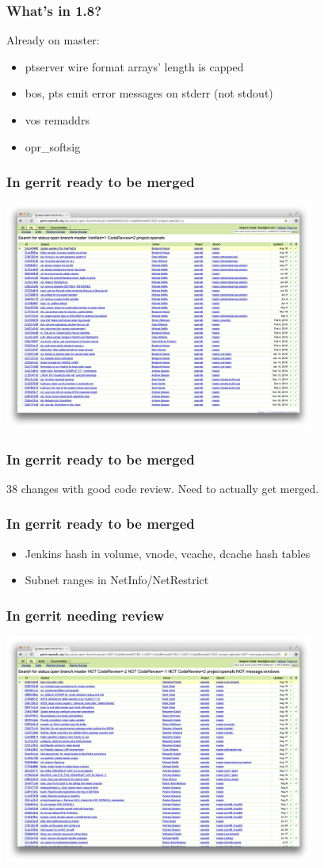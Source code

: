 \documentclass{beamer}
\begin{document}
\begin{frame}
\frametitle{What's in 1.8?}
Already on master:
\begin{itemize}
\item{ptserver wire format arrays' length is capped}
\item{bos, pts emit error messages on stderr (not stdout)}
\item{vos remaddrs}
\item{opr\_softsig}
\end{itemize}
\end{frame}

\begin{frame}
\frametitle{In gerrit ready to be merged}
\includegraphics[width=4in]{gerrit-approved}
\end{frame}

\begin{frame}
\frametitle{In gerrit ready to be merged}
38 changes with good code review.
\vspace{1em}
Need to actually get merged.
\end{frame}

\begin{frame}
\frametitle{In gerrit ready to be merged}
\begin{itemize}
\item{Jenkins hash in volume, vnode, vcache, dcache hash tables}
\item{Subnet ranges in NetInfo/NetRestrict}
\end{itemize}
\end{frame}

\begin{frame}
\frametitle{In gerrit needing review}
\includegraphics[width=4in]{gerrit-needsreview}
\end{frame}
\end{document}
